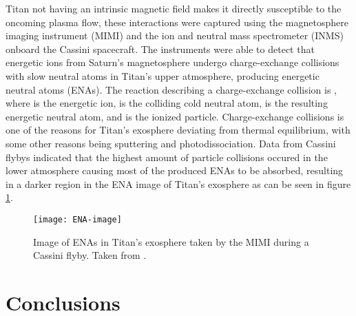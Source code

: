 \documentclass[12pt, parskip=full*, abstract]{scrartcl}
\begin{document}
Titan not having an intrinsic magnetic field \parencite{titan-exosphere-interaction} makes it directly susceptible to the oncoming plasma flow, these interactions were captured using the magnetosphere imaging instrument (MIMI) and the ion and neutral mass spectrometer (INMS) onboard the Cassini spacecraft. The instruments were able to detect that energetic ions from Saturn's magnetosphere undergo charge-exchange collisions with slow neutral atoms in Titan's upper atmosphere, producing energetic neutral atoms (ENAs). The reaction describing a charge-exchange collision is , where  is the energetic ion,  is the colliding cold neutral atom,  is the resulting energetic neutral atom, and  is the ionized particle. Charge-exchange collisions is one of the reasons for Titan's exosphere deviating from thermal equilibrium, with some other reasons being sputtering and photodissociation. Data from Cassini flybys indicated that the highest amount of particle collisions occured in the lower atmosphere causing most of the produced ENAs to be absorbed, resulting in a darker region in the ENA image of Titan's exosphere as can be seen in figure \ref{fig:ENA-image}.

\begin{figure}[htbp]
	\centering
	\texttt{[image: ENA-image]}
	\caption{Image of ENAs in Titan's exosphere taken by the MIMI during a Cassini flyby. Taken from \textcite{titan-exosphere-interaction}.}
	\label{fig:ENA-image}
\end{figure}




 

\section{Conclusions}

\newpage
\printbibliography
\end{document}
